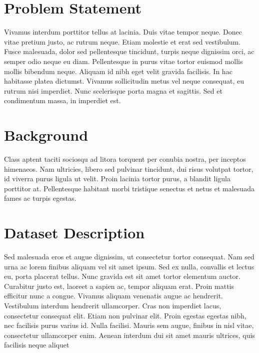 \hypertarget{problem-statement}{%
\section{Problem Statement}\label{problem-statement}}

Vivamus interdum porttitor tellus at lacinia. Duis vitae tempor neque.
Donec vitae pretium justo, ac rutrum neque. Etiam molestie et erat sed
vestibulum. Fusce malesuada, dolor sed pellentesque tincidunt, turpis
neque dignissim orci, ac semper odio neque eu diam. Pellentesque in
purus vitae tortor euismod mollis mollis bibendum neque. Aliquam id nibh
eget velit gravida facilisis. In hac habitasse platea dictumst. Vivamus
sollicitudin metus vel neque consequat, eu rutrum nisi imperdiet. Nunc
scelerisque porta magna et sagittis. Sed et condimentum massa, in
imperdiet est.

\hypertarget{background}{%
\section{Background}\label{background}}

Class aptent taciti sociosqu ad litora torquent per conubia nostra, per
inceptos himenaeos. Nam ultricies, libero sed pulvinar tincidunt, dui
risus volutpat tortor, id viverra purus ligula ut velit. Proin lacinia
tortor purus, a blandit ligula porttitor at. Pellentesque habitant morbi
tristique senectus et netus et malesuada fames ac turpis egestas.

\hypertarget{dataset-description}{%
\section{Dataset Description}\label{dataset-description}}

Sed malesuada eros et augue dignissim, ut consectetur tortor consequat.
Nam sed urna ac lorem finibus aliquam vel sit amet ipsum. Sed ex nulla,
convallis et lectus eu, porta placerat tellus. Nunc gravida est sit amet
tortor elementum auctor. Curabitur justo est, laoreet a sapien ac,
tempor aliquam erat. Proin mattis efficitur nunc a congue. Vivamus
aliquam venenatis augue ac hendrerit. Vestibulum interdum hendrerit
ullamcorper. Cras non imperdiet lacus, consectetur consequat elit. Etiam
non pulvinar elit. Proin egestas egestas nibh, nec facilisis purus
varius id. Nulla facilisi. Mauris sem augue, finibus in nisl vitae,
consectetur ullamcorper enim. Aenean interdum dui sit amet mauris
ultrices, quis facilisis neque aliquet

